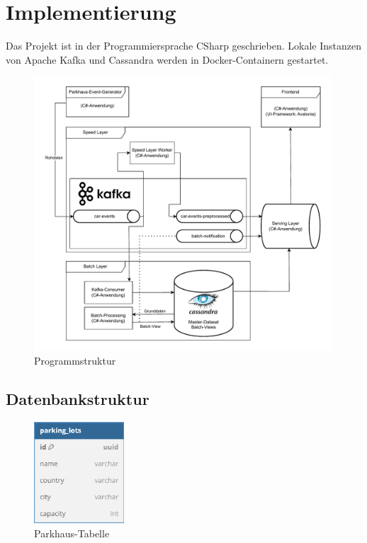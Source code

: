 \chapter{Implementierung}

Das Projekt ist in der Programmiersprache CSharp geschrieben.
Lokale Instanzen von Apache Kafka und Cassandra werden in Docker-Containern gestartet.

\begin{figure}[h!]%
    \centering%
    \includegraphics[width=0.99\textwidth]{Graphics/Implementation.drawio.pdf}%
    \caption{Programmstruktur}%
    \label{fig:implementation}
\end{figure}%

\section{Datenbankstruktur}

\begin{figure}[h!]%
    \centering%
    \includegraphics[width=0.3\textwidth]{Graphics/ParkingLotTable.png}%
    \caption{Parkhaus-Tabelle}%
    \label{fig:table_parking_lots}
\end{figure}%

